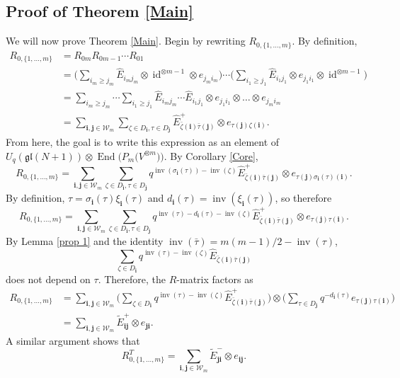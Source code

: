 \documentclass[pdftex]{sigma}
\numberwithin{equation}{section}
\DeclareMathOperator{\End}{End}
\DeclareMathOperator{\id}{id}
\DeclareMathOperator{\inv}{inv}
\newcommand{\Uqgl}{{U_q(\mathfrak{gl}(N+1))}}
\newcommand{\ii}{{\mathbf{i}}}
\newcommand{\jj}{{\mathbf{j}}}
\begin{document}
\subsection{Proof of Theorem \ref{Main}}
We will now prove Theorem \ref{Main}. Begin by rewriting $R_{0,\{1,\dots,m\}}$. By definition,
\begin{align*}
R_{0,\{1,\dots,m\}} &= R_{0m}R_{0m-1}\cdots R_{01} \\
&=\bigg( \sum_{i_m \geq j_m} \hat{E}_{i_mj_m} \otimes \id^{\otimes m-1} \otimes e_{j_mi_m} \bigg) \cdots \bigg(\sum_{i_1\geq j_1}\hat{E}_{i_1j_1}\otimes e_{j_1i_1} \otimes \id^{\otimes m-1}\bigg)
\\&= \sum_{i_m \geq j_m} \cdots \sum_{i_1\geq j_1} \hat{E}_{i_mj_m} \cdots \hat{E}_{i_1j_1} \otimes e_{j_1i_1} \otimes \dots \otimes e_{j_mi_m} \\
&= \sum_{\ii,\jj \in \mathcal{W}_m } \sum_{\zeta \in D_{\ii},\tau \in D_{\jj}}\hat{E}_{\bar{\zeta}(\ii)\bar{\tau}(\jj)}^{+} \otimes e_{\tau(\jj)\zeta(\ii)}.
\end{align*}
From here, the goal is to write this expression as an element of $\Uqgl \otimes \End\big(P_m\big(V^{\otimes m}\big)\big)$. By Corollary \ref{Core},
\[
R_{0,\{1,\dots,m\}} = \sum_{\ii,\jj \in \mathcal{W}_m } \sum_{\zeta \in D_{\ii},\tau \in D_{\jj}}q^{\inv(\sigma_{\ii}(\tau)) -\inv(\zeta)}\hat{E}^+_{\bar{\zeta}(\ii)\bar{\tau}(\jj)} \otimes e_{\tau(\jj)\sigma_{\ii}(\tau)(\ii)}.
\]
By definition, $\tau = \sigma_{\ii}(\tau) \xi_{\ii}(\tau)$ and $d_{\ii}(\tau) = \inv(\xi_{\ii}(\tau))$, so therefore
\[
R_{0,\{1,\dots,m\}} = \sum_{\ii,\jj \in \mathcal{W}_m } \sum_{\zeta \in D_{\ii},\tau \in D_{\jj}}q^{\inv(\tau) -d_{\ii}(\tau) -\inv(\zeta)}\hat{E}^+_{\bar{\zeta}(\ii)\bar{\tau}(\jj)} \otimes e_{\tau(\jj)\tau(\ii)}.
\]
By Lemma \ref{prop 1} and the identity $\inv(\bar{\tau}) = m(m-1)/2 - \inv(\tau)$,
\[
\sum_{\zeta \in D_{\ii}}q^{\inv(\tau) -\inv(\zeta)}\hat{E}_{\bar{\zeta}(\ii)\bar{\tau}(\jj)}
\]
does not depend on $\tau$. Therefore, the $R$-matrix factors as
\begin{align*}
R_{0,\{1,\dots,m\} } &= \sum_{\ii,\jj \in \mathcal{W}_m } \bigg( \sum_{\zeta \in D_{\ii}}q^{\inv(\tau) -\inv(\zeta)}\hat{E}^+_{\bar{\zeta}(\ii)\bar{\tau}(\jj)} \bigg) \otimes \bigg( \sum_{\tau \in D_{\jj}} q^{-d_{\ii}(\tau)}e_{\tau(\jj)\tau(\ii)} \bigg) \\
&= \sum_{\ii,\jj \in \mathcal{W}_m } \tilde{E}_{\ii\jj}^+ \otimes e_{\jj\ii}.
\end{align*}
A similar argument shows that
\[
R^T_{0,\{1,\dots,m\}}=\sum_{\ii,\jj \in \mathcal{W}_m } \tilde{E}^-_{\jj\ii} \otimes e_{\ii\jj}.
\]
\end{document}
